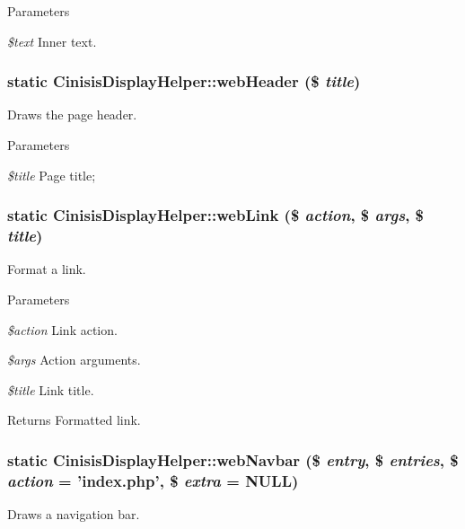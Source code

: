 \begin{DoxyParams}{Parameters}
\item[{\em \$text}]Inner text. \end{DoxyParams}
\hypertarget{classCinisisDisplayHelper_a356d8117dfcb220b7bb9996b569f5f25}{
\subsubsection[{webHeader}]{\setlength{\rightskip}{0pt plus 5cm}static CinisisDisplayHelper::webHeader (\$ {\em title})}}
\label{classCinisisDisplayHelper_a356d8117dfcb220b7bb9996b569f5f25}
Draws the page header.


\begin{DoxyParams}{Parameters}
\item[{\em \$title}]Page title; \end{DoxyParams}
\hypertarget{classCinisisDisplayHelper_aadc869909d8be43402d73fa3415827b4}{
\subsubsection[{webLink}]{\setlength{\rightskip}{0pt plus 5cm}static CinisisDisplayHelper::webLink (\$ {\em action}, \/  \$ {\em args}, \/  \$ {\em title})}}
\label{classCinisisDisplayHelper_aadc869909d8be43402d73fa3415827b4}
Format a link.


\begin{DoxyParams}{Parameters}
\item[{\em \$action}]Link action.\item[{\em \$args}]Action arguments.\item[{\em \$title}]Link title.\end{DoxyParams}
\begin{DoxyReturn}{Returns}
Formatted link. 
\end{DoxyReturn}
\hypertarget{classCinisisDisplayHelper_a291e2da97fd646e7fa34fb92879fc3d6}{
\subsubsection[{webNavbar}]{\setlength{\rightskip}{0pt plus 5cm}static CinisisDisplayHelper::webNavbar (\$ {\em entry}, \/  \$ {\em entries}, \/  \$ {\em action} = {\ttfamily 'index.php'}, \/  \$ {\em extra} = {\ttfamily NULL})}}
\label{classCinisisDisplayHelper_a291e2da97fd646e7fa34fb92879fc3d6}
Draws a navigation bar.


